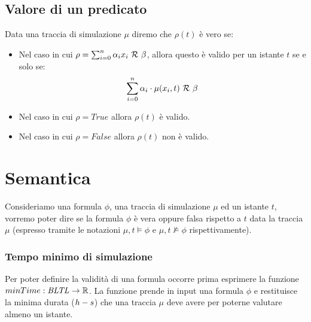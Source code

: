 \documentclass[10pt,a4paper]{article}
\begin{document}
	
	\subsection{Valore di un predicato}
	Data una traccia di simulazione $\mu$ diremo che $\rho(t)$ è vero se:
	
	\begin{itemize}
		\item 	Nel caso in cui $\rho = \sum_{i=0}^{n}{\alpha{}_i x_i\ \mathcal{R}\ \beta{}}$, allora questo è valido per un istante $t$ se e solo se:
		$$\sum_{i=0}^{n}{\alpha{}_i\cdot \mu(x_i,t)}\ \MetaRel\ \beta{}$$
		
		\item Nel caso in cui $\rho = True$ allora $\rho(t)$ è valido.
		
		\item Nel caso in cui $\rho = False$ allora $\rho(t)$ non è valido.

	\end{itemize}

	
	
	
	\section{Semantica \BLTL}
	
	Consideriamo una formula \BLTL{} $\phi$, una traccia di simulazione $\mu$ ed un istante $t$, vorremo poter dire se la formula $\phi$ è vera oppure falsa rispetto a $t$ data la traccia $\mu$ (espresso tramite le notazioni  $\mu,t \models \phi$ e  $\mu,t \not\models \phi$ rispettivamente).
	

	\subsubsection{Tempo minimo di simulazione}
	Per poter definire la validità di una formula occorre prima esprimere la funzione $minTime:\mbox{\emph{BLTL}}\to\mathbb{R}$.
	La funzione prende in input una formula \BLTL{} $\phi$ e restituisce la minima durata ($h-s$) che una traccia $\mu$ deve avere per poterne valutare almeno un istante.
\end{document}
